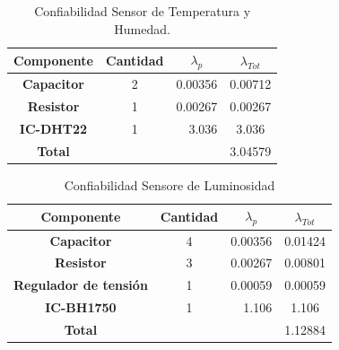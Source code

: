 \begin{table}[H]
\centering
\begin{tabular}{|c|crc|}
\hline
\textbf{Componente} & \multicolumn{1}{c|}{\textbf{Cantidad}} & \multicolumn{1}{c|}{\textbf{$\lambda_p$}}            & \textbf{$\lambda_{Tot}$}   \\ \hline
\textbf{Capacitor}  & \multicolumn{1}{c|}{2}                 & \multicolumn{1}{r|}{0.00356}                         & 0.00712                      \\ \hline
\textbf{Resistor}   & \multicolumn{1}{c|}{1}                 & \multicolumn{1}{r|}{\cellcolor[HTML]{FFFFFF}0.00267} & 0.00267                      \\ \hline
\textbf{IC-DHT22}   & \multicolumn{1}{c|}{1}                 & \multicolumn{1}{r|}{\cellcolor[HTML]{FFFFFF}3.036}   & 3.036                        \\ \hline
\textbf{Total}      & \multicolumn{1}{l}{}                   & \multicolumn{1}{l}{}                                 & \multicolumn{1}{r|}{3.04579} \\ \hline
\end{tabular}
\caption{Confiabilidad Sensor de Temperatura y Humedad.}
\label{tab:conftemphum}
\end{table}
\begin{table}[H]
\centering
\begin{tabular}{|c|crc|}
\hline
\textbf{Componente}           & \multicolumn{1}{c|}{\textbf{Cantidad}} & \multicolumn{1}{c|}{\textbf{$\lambda_p$}}            & \textbf{$\lambda_{Tot}$}   \\ \hline
\textbf{Capacitor}            & \multicolumn{1}{c|}{4}                 & \multicolumn{1}{r|}{0.00356}                         & 0.01424                      \\ \hline
\textbf{Resistor}             & \multicolumn{1}{c|}{3}                 & \multicolumn{1}{r|}{\cellcolor[HTML]{FFFFFF}0.00267} & 0.00801                      \\ \hline
\textbf{Regulador de tensión} & \multicolumn{1}{c|}{1}                 & \multicolumn{1}{r|}{\cellcolor[HTML]{FFFFFF}0.00059} & 0.00059                      \\ \hline
\textbf{IC-BH1750}            & \multicolumn{1}{c|}{1}                 & \multicolumn{1}{r|}{1.106}                           & 1.106                        \\ \hline
\textbf{Total}                & \multicolumn{1}{l}{}                   & \multicolumn{1}{l}{}                                 & \multicolumn{1}{r|}{1.12884} \\ \hline
\end{tabular}
\caption{Confiabilidad Sensore de Luminosidad}
\label{tab:conflum}
\end{table}
%
